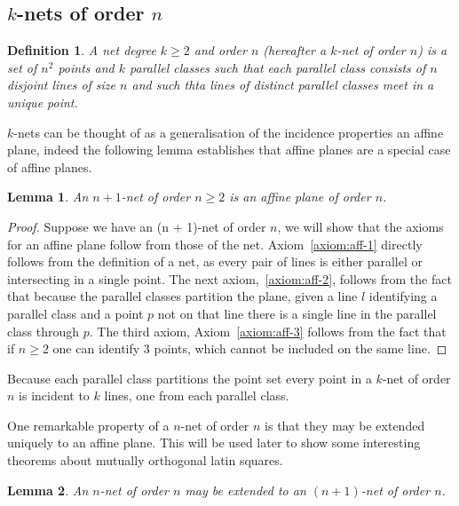 \documentclass{article}
\newtheorem{lemma}{Lemma}
\newtheorem{definition}{Definition}
\begin{document}
\subsection{\(k\)-nets of order \(n\)}


\begin{definition}
  A net degree \(k \geq 2\) and order \(n\) (hereafter a \(k\)-net of order \(n\)) is a set of \(n^2\) points and \(k\) parallel classes such that each parallel class consists of \(n\)
  disjoint lines of size \(n\) and such thta lines of distinct parallel classes meet in a unique point.
\end{definition}

\(k\)-nets can be thought of as a generalisation of the incidence properties an affine plane, indeed the following lemma establishes that affine planes are a special case of affine planes.

\begin{lemma}
An \(n + 1\)-net of order \(n \geq 2\) is an affine plane of order \(n\).
\end{lemma}

\begin{proof}
  Suppose we have an (n + 1)-net of order \(n\), we will show that the axioms for an affine plane follow from those of the net. 
  Axiom~\ref{axiom:aff-1} directly follows from the definition of a net, as every pair of lines is either parallel or intersecting in a single point. The next axiom,~\ref{axiom:aff-2}, follows from the fact that because the parallel classes partition the plane, 
  given a line \(l\) identifying a parallel class and a point \(p\) not on that line there is a single line in the parallel class through \(p\). The third axiom, Axiom~\ref{axiom:aff-3} follows from the fact that if \(n \geq 2\) one can identify 3 points, which cannot be included on the same line. 
\end{proof}

Because each parallel class partitions the point set every point in a \(k\)-net of order \(n\) is incident to \(k\) lines, one from each parallel class.

One remarkable property of a \(n\)-net of order \(n\) is that they may be extended uniquely to an affine plane. This will be used later to show some interesting theorems about mutually orthogonal latin squares.

\begin{lemma}\label{lemma:net-extension}
An \(n\)-net of order \(n\) may be extended to an \((n + 1)\)-net of order \(n\).
\end{lemma}
\end{document}
